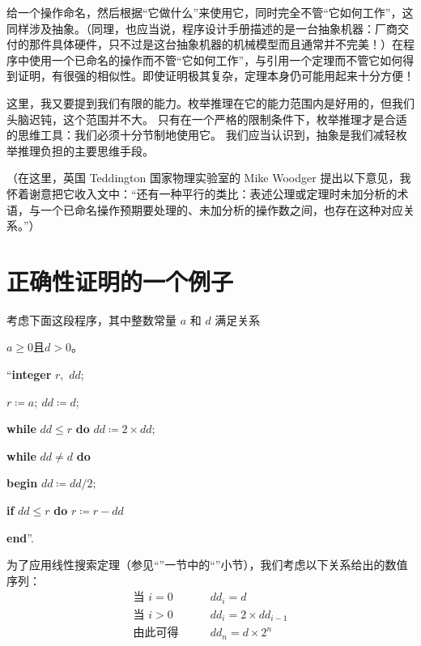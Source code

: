 给一个操作命名，然后根据“它做什么”来使用它，同时完全不管“它如何工作”，这同样涉及抽象。（同理，也应当说，程序设计手册描述的是一台抽象机器：厂商交付的那件具体硬件，只不过是这台抽象机器的机械模型\textemdash{}而且通常并不完美！）在程序中使用一个已命名的操作而不管“它如何工作”，与引用一个定理而不管它如何得到证明，有很强的相似性。即使证明极其复杂，定理本身仍可能用起来十分方便！

这里，我又要提到我们有限的能力。枚举推理在它的能力范围内是好用的，但我们头脑迟钝，这个范围并不大。
只有在一个严格的限制条件下，枚举推理才是合适的思维工具：我们必须十分节制地使用它。
我们应当认识到，抽象是我们减轻枚举推理负担的主要思维手段。

（在这里，英国 Teddington 国家物理实验室的 Mike Woodger 提出以下意见，我怀着谢意把它收入文中：“还有一种平行的类比：表述公理或定理时未加分析的术语，与一个已命名操作预期要处理的、未加分析的操作数之间，也存在这种对应关系。”）

\section[正确性证明的一个例子]{正确性证明的一个例子}

考虑下面这段程序，其中整数常量 $a$ 和 $d$ 满足关系
\medskip

{
	\setlength{\parindent}{8em}
	$a \geqslant 0$\quad 且\quad $d > 0$。
	
	\hspace{-.4em}``\textbf{integer} $r$,\ $dd$;
	
	$r \coloneq a;\ dd \coloneq d$;
	
	\textbf{while} $dd \leqslant r$ \textbf{do} $dd \coloneq 2\times dd;$
	
	\textbf{while} $dd \neq d$ \textbf{do}
	
	\quad \textbf{begin} $dd \coloneq dd/2;$
	
	\quad\quad \textbf{if} $dd \leqslant r$ \textbf{do} $r \coloneq r - dd$
	
	\quad\textbf{end}''.
}
\medskip

为了应用线性搜索定理（参见“”一节中的“”小节），我们考虑以下关系给出的数值序列：
\begin{equation}
	\label{eq:example-initial}
	\begin{split}
		\text{当 } i = 0\qquad & dd_i = d \\
		\text{当 } i > 0\qquad & dd_i = 2\times dd_{i - 1}\\
		\text{由此可得}\qquad & dd_n = d\times 2^n
	\end{split}
\end{equation}


